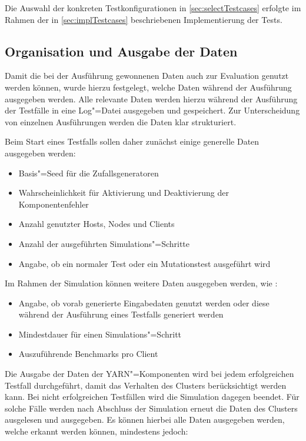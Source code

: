 Die Auswahl der konkreten Testkonfigurationen in \cref{sec:selectTestcases} erfolgte im Rahmen der in \cref{sec:implTestcases} beschriebenen Implementierung der Tests.

\subsection{Organisation und Ausgabe der Daten}
\label{subsec:dataOrganisation}

Damit die bei der Ausführung gewonnenen Daten auch zur Evaluation genutzt werden können, wurde hierzu festgelegt, welche Daten während der Ausführung ausgegeben werden.
Alle relevante Daten werden hierzu während der Ausführung der Testfälle in eine Log"=Datei ausgegeben und gespeichert.
Zur Unterscheidung von einzelnen Ausführungen werden die Daten klar strukturiert.

Beim Start eines Testfalls sollen daher zunächst einige generelle Daten ausgegeben werden:

\begin{itemize}
    \item Basis"=Seed für die Zufallsgeneratoren
    \item Wahrscheinlichkeit für Aktivierung und Deaktivierung der Komponentenfehler
    \item Anzahl genutzter Hosts, Nodes und Clients
    \item Anzahl der ausgeführten Simulations"=Schritte
    \item Angabe, ob ein normaler Test oder ein Mutationstest ausgeführt wird
\end{itemize}

Im Rahmen der Simulation können weitere Daten ausgegeben werden, wie \zB:

\begin{itemize}
    \item Angabe, ob vorab generierte Eingabedaten genutzt werden oder diese während der Ausführung eines Testfalls generiert werden
    \item Mindestdauer für einen Simulations"=Schritt
    \item Auszuführende Benchmarks pro Client
\end{itemize}

Die Ausgabe der Daten der \ac{YARN}"=Komponenten wird bei jedem erfolgreichen Testfall durchgeführt, damit das Verhalten des Clusters berücksichtigt werden kann.
Bei nicht erfolgreichen Testfällen wird die Simulation dagegen beendet.
Für solche Fälle werden nach Abschluss der Simulation erneut die Daten des Clusters ausgelesen und ausgegeben.
Es können hierbei alle Daten ausgegeben werden, welche erkannt werden können, mindestens jedoch:

